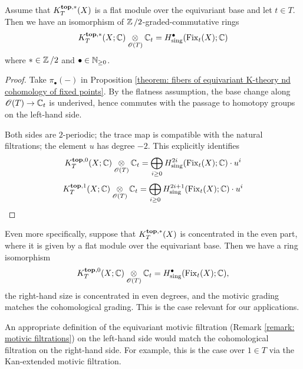 \begin{corollary}\label{corollary: K-theory in the flat situation}
Assume that $K_{T}^{\mathbf{top}, *}(X)$ is a flat module over the equivariant base and let $t \in T$.
Then we have an isomorphism of $\operatorname{\mathbb{Z}}/2$-graded-commutative rings
\begin{equation*}
    K_{T}^{\mathbf{top}, *}(X; \operatorname{\mathbb{C}}) \underset{\operatorname{\mathscr{O}}(T)}{\otimes} \operatorname{\mathbb{C}}_t = H^{\bullet}_{\mathrm{sing}}(\operatorname{Fix}_t(X); \operatorname{\mathbb{C}})
\end{equation*}
where $* \in \operatorname{\mathbb{Z}}/2$ and $\bullet \in \operatorname{\mathbb{N}}_{\geq 0}$. 
\end{corollary}
\begin{proof}
Take $\pi_{\bullet}(-)$ in Proposition \ref{theorem: fibers of equivariant K-theory nd cohomology of fixed points}.
By the flatness assumption, the base change along $\operatorname{\mathscr{O}}(T) \to \operatorname{\mathbb{C}}_t$ is underived, hence commutes with the passage to homotopy groups on the left-hand side. 

Both sides are $2$-periodic; the trace map is compatible with the natural filtrations; the element $u$ has degree $-2$. This explicitly identifies
\begin{equation*}
    K_{T}^{\mathbf{top}, 0}(X; \operatorname{\mathbb{C}}) \underset{\operatorname{\mathscr{O}}(T)}{\otimes} \operatorname{\mathbb{C}}_t = \bigoplus_{i \geq 0} H^{2i}_{\mathrm{sing}}(\operatorname{Fix}_t(X); \operatorname{\mathbb{C}}) \cdot u^i
\end{equation*}
\begin{equation*}
    K_{T}^{\mathbf{top}, 1}(X; \operatorname{\mathbb{C}}) \underset{\operatorname{\mathscr{O}}(T)}{\otimes} \operatorname{\mathbb{C}}_t = \bigoplus_{i\geq 0} H^{2i+1}_{\mathrm{sing}}(\operatorname{Fix}_t(X); \operatorname{\mathbb{C}}) \cdot u^i
\end{equation*}
\end{proof}

\begin{remark}\label{remark: K-theory in the superflat situaton}
Even more specifically, suppose that $K_{T}^{\mathbf{top}, *}(X)$ is concentrated in the even part, where it is given by a flat module over the equivariant base. Then we have a ring isomorphism
$$K_{T}^{\mathbf{top}, 0}(X; \operatorname{\mathbb{C}})\underset{\operatorname{\mathscr{O}}(T)}{\otimes} \operatorname{\mathbb{C}}_t =  H^{\bullet}_{\mathrm{sing}}(\operatorname{Fix}_t(X); \operatorname{\mathbb{C}}),$$
the right-hand size is concentrated in even degrees, and the motivic grading matches the cohomological grading. This is the case relevant for our applications.
\end{remark}


\begin{aside}
An appropriate definition of the equivariant motivic filtration (Remark \ref{remark: motivic filtrations}) on the left-hand side would match the cohomological filtration on the right-hand side. For example, this is the case over $1 \in T$ via the Kan-extended motivic filtration.
\end{aside}



